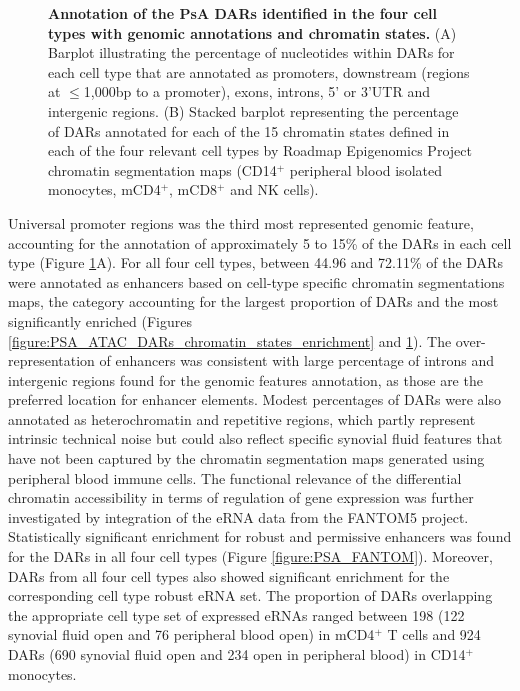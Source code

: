 \begin{figure}[htbp]
\begin{subfigure}[b]{0.75\textwidth}
\caption{}
\end{subfigure}
\caption[Annotation of the PsA DARs identified in the four cell types with genomic annotations and chromatin states.]{\textbf{Annotation of the PsA DARs identified in the four cell types with genomic annotations and chromatin states.} (A) Barplot illustrating the percentage of nucleotides within DARs for each cell type that are annotated as promoters, downstream (regions at $\leq$1,000bp to a promoter), exons, introns, 5' or 3'UTR and intergenic regions. (B) Stacked barplot representing the percentage of DARs annotated for each of the 15 chromatin states defined in each of the four relevant cell types by Roadmap Epigenomics Project chromatin segmentation maps (CD14$^+$ peripheral blood isolated monocytes, mCD4$^+$, mCD8$^+$ and NK cells).}
\label{figure:PsA_FAST_ATAC_DOCS_annotation}
\end{figure}

Universal promoter regions was the third most represented genomic feature, accounting for the annotation of approximately 5 to 15\% of the DARs in each cell type (Figure \ref{figure:PsA_FAST_ATAC_DOCS_annotation}A). For all four cell types, between 44.96 and 72.11\% of the DARs were annotated as enhancers based on cell-type specific chromatin segmentations maps, the category accounting for the largest proportion of DARs and the most significantly enriched (Figures \ref{figure:PSA_ATAC_DARs_chromatin_states_enrichment} and \ref{figure:PsA_FAST_ATAC_DOCS_annotation}). The over-representation of enhancers was consistent with large percentage of introns and intergenic regions found for the genomic features annotation, as those are the preferred location for enhancer elements. Modest percentages of DARs were also annotated as heterochromatin and repetitive regions, which partly represent intrinsic technical noise but could also reflect specific synovial fluid features that have not been captured by the chromatin segmentation maps generated using peripheral blood immune cells.
%
The functional relevance of the differential chromatin accessibility in terms of regulation of gene expression was further investigated by integration of the eRNA data from the FANTOM5 project. Statistically significant enrichment for robust and permissive enhancers was found for the DARs in all four cell types (Figure \ref{figure:PSA_FANTOM}).  Moreover, DARs from all four cell types also showed significant enrichment for the corresponding cell type robust eRNA set. The proportion of DARs overlapping the appropriate cell type set of expressed eRNAs ranged between 198 (122 synovial fluid open and 76 peripheral blood open) in mCD4$^+$ T cells and 924 DARs (690 synovial fluid open and 234 open in peripheral blood) in CD14$^+$ monocytes.


